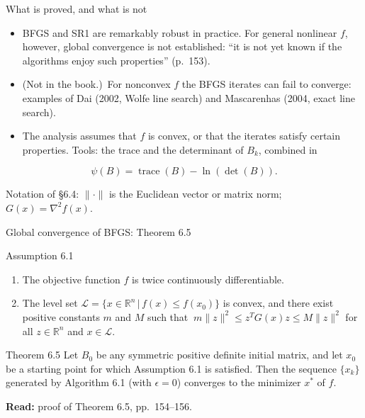 \documentclass[aspectratio=169,12pt]{beamer}
\newcommand{\R}{\mathbb{R}}
\newcommand{\xs}{x^{*}}
\newcommand{\hessf}{\nabla^{2} f}
\newcommand{\Lcal}{\mathcal{L}}
\newcommand{\tr}{\operatorname{trace}}
\newcommand{\eqn}[1]{\text{\small(#1)}}
\newcommand{\readbook}[1]{{\color{red}\textbf{Read:} #1}}
\newcommand{\notinbook}{{\small(Not in the book.)}}
\begin{document}
\begin{frame}{What is proved, and what is not}
  \begin{itemize}\setlength\itemsep{0.45em}
    \item BFGS and SR1 are remarkably robust in practice. For general nonlinear $f$,
      however, global convergence is not established: ``it is not yet known if the
      algorithms enjoy such properties'' (p.~153).
    \item \notinbook\ For nonconvex $f$ the BFGS iterates can fail to converge: examples of
      Dai (2002, Wolfe line search) and Mascarenhas (2004, exact line search).
    \item The analysis assumes that $f$ is convex, or that the iterates satisfy certain
      properties. Tools: the trace and the determinant of $B_{k}$, combined in
  \end{itemize}
  \[ \psi(B)=\tr(B)-\ln(\det(B)) . \tag{6.49} \]

  \vspace{0.2em}
  Notation of \S6.4: $\|\cdot\|$ is the Euclidean vector or matrix norm; $G(x)=\hessf(x)$.
\end{frame}

\begin{frame}{Global convergence of BFGS: Theorem 6.5}
  \begin{block}{Assumption 6.1}
    \begin{enumerate}\setlength\itemsep{0.1em}
      \item[(i)] The objective function $f$ is twice continuously differentiable.
      \item[(ii)] The level set $\Lcal=\{x\in\R^{n}\,|\,f(x)\le f(x_{0})\}$ is convex, and there exist
        positive constants $m$ and $M$ such that
        $\ m\|z\|^{2}\le z^{T}G(x)z\le M\|z\|^{2}$ \eqn{6.39}
        for all $z\in\R^{n}$ and $x\in\Lcal$.
    \end{enumerate}
  \end{block}

  \begin{block}{Theorem 6.5}
    Let $B_{0}$ be any symmetric positive definite initial matrix, and let $x_{0}$ be a starting
    point for which Assumption 6.1 is satisfied. Then the sequence $\{x_{k}\}$ generated by
    Algorithm 6.1 (with $\epsilon=0$) converges to the minimizer $\xs$ of $f$.
  \end{block}

  \readbook{proof of Theorem 6.5, pp.~154--156.}
\end{frame}
\end{document}
